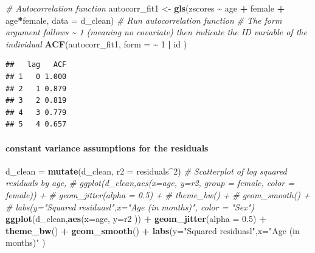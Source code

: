 \documentclass[
]{article}
\newenvironment{Shaded}{\begin{snugshade}}{\end{snugshade}}
\newcommand{\AttributeTok}[1]{\textcolor[rgb]{0.13,0.29,0.53}{#1}}
\newcommand{\CommentTok}[1]{\textcolor[rgb]{0.56,0.35,0.01}{\textit{#1}}}
\newcommand{\DecValTok}[1]{\textcolor[rgb]{0.00,0.00,0.81}{#1}}
\newcommand{\FloatTok}[1]{\textcolor[rgb]{0.00,0.00,0.81}{#1}}
\newcommand{\FunctionTok}[1]{\textcolor[rgb]{0.13,0.29,0.53}{\textbf{#1}}}
\newcommand{\NormalTok}[1]{#1}
\newcommand{\OtherTok}[1]{\textcolor[rgb]{0.56,0.35,0.01}{#1}}
\newcommand{\SpecialCharTok}[1]{\textcolor[rgb]{0.81,0.36,0.00}{\textbf{#1}}}
\newcommand{\StringTok}[1]{\textcolor[rgb]{0.31,0.60,0.02}{#1}}
\begin{document}
\begin{Shaded}
\begin{Highlighting}[]
\CommentTok{\# Autocorrelation function}
\NormalTok{autocorr\_fit1 }\OtherTok{\textless{}{-}} \FunctionTok{gls}\NormalTok{(zscores }\SpecialCharTok{\textasciitilde{}}\NormalTok{ age }\SpecialCharTok{+}\NormalTok{ female }\SpecialCharTok{+}\NormalTok{ age}\SpecialCharTok{*}\NormalTok{female, }\AttributeTok{data =}\NormalTok{ d\_clean)}
\CommentTok{\# Run autocorrelation function}
\CommentTok{\# The form argument follows \textasciitilde{} 1 (meaning no covariate) then indicate the ID variable of the individual}
\FunctionTok{ACF}\NormalTok{(autocorr\_fit1, }\AttributeTok{form =} \SpecialCharTok{\textasciitilde{}}   \DecValTok{1} \SpecialCharTok{|}\NormalTok{ id )}
\end{Highlighting}
\end{Shaded}

\begin{verbatim}
##   lag   ACF
## 1   0 1.000
## 2   1 0.879
## 3   2 0.819
## 4   3 0.779
## 5   4 0.657
\end{verbatim}

\hypertarget{constant-variance-assumptions-for-the-residuals}{%
\paragraph{constant variance assumptions for the
residuals}\label{constant-variance-assumptions-for-the-residuals}}

\begin{Shaded}
\begin{Highlighting}[]
\NormalTok{d\_clean }\OtherTok{=} \FunctionTok{mutate}\NormalTok{(d\_clean, }\AttributeTok{r2 =}\NormalTok{ residuals}\SpecialCharTok{\^{}}\DecValTok{2}\NormalTok{)}
\CommentTok{\# Scatterplot of log squared residuals by age,}
\CommentTok{\# ggplot(d\_clean,aes(x=age, y=r2, group = female, color = female)) +}
\CommentTok{\#     geom\_jitter(alpha = 0.5) +}
\CommentTok{\#     theme\_bw() +}
\CommentTok{\#     geom\_smooth() +}
\CommentTok{\#     labs(y="Squared residuasl",x="Age (in months)", color = "Sex")}
\FunctionTok{ggplot}\NormalTok{(d\_clean,}\FunctionTok{aes}\NormalTok{(}\AttributeTok{x=}\NormalTok{age, }\AttributeTok{y=}\NormalTok{r2 )) }\SpecialCharTok{+}
    \FunctionTok{geom\_jitter}\NormalTok{(}\AttributeTok{alpha =} \FloatTok{0.5}\NormalTok{) }\SpecialCharTok{+}
    \FunctionTok{theme\_bw}\NormalTok{() }\SpecialCharTok{+}
    \FunctionTok{geom\_smooth}\NormalTok{() }\SpecialCharTok{+}
    \FunctionTok{labs}\NormalTok{(}\AttributeTok{y=}\StringTok{"Squared residuasl"}\NormalTok{,}\AttributeTok{x=}\StringTok{"Age (in months)"}\NormalTok{ )}
\end{Highlighting}
\end{Shaded}
\end{document}
